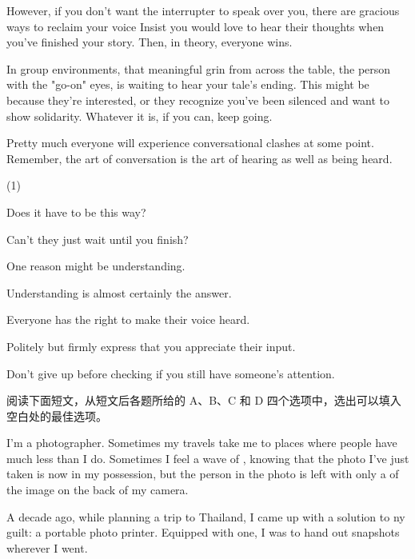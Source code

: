 \documentclass{英语试卷}
\begin{document}
\par However, if you don't want the interrupter to speak over you, there are gracious ways to reclaim your voice  Insist you would love to hear their thoughts when you've finished your story. Then, in theory, everyone wins.\par
\par {} In group environments, that meaningful grin from across the table, the person with the "go-on" eyes, is waiting to hear your tale's ending. This might be because they're interested, or they recognize you've been silenced and want to show solidarity. Whatever it is, if you can, keep going.\par
\par Pretty much everyone will experience conversational clashes at some point. Remember, the art of conversation is the art of hearing as well as being heard.\par
\begin{choices}(1)
  \item Does it have to be this way?
  \item Can't they just wait until you finish?
  \item One reason might be understanding.
  \item Understanding is almost certainly the answer.
  \item Everyone has the right to make their voice heard.
  \item Politely but firmly express that you appreciate their input.
  \item Don't give up before checking if you still have someone's attention.
\end{choices}
\par 阅读下面短文，从短文后各题所给的 A、B、C 和 D 四个选项中，选出可以填入空白处的最佳选项。\par
\par I'm a photographer. Sometimes my travels take me to places where people have much less than I do. Sometimes I feel a wave of , knowing that the photo I've just taken is now in my possession, but the person in the photo is left with only a  of the image on the back of my camera.\par
\par A decade ago, while planning a trip to Thailand, I came up with a solution to  ny guilt: a portable photo printer. Equipped with one, I was  to hand out snapshots wherever I went.\par
\end{document}
